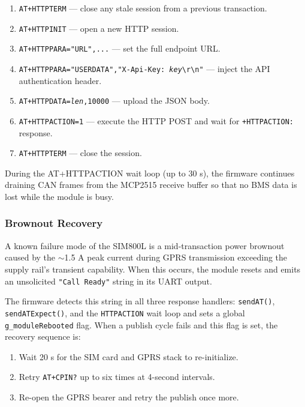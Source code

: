 \begin{enumerate}
    \item \texttt{AT+HTTPTERM} — close any stale session from a previous transaction.
    \item \texttt{AT+HTTPINIT} — open a new HTTP session.
    \item \texttt{AT+HTTPPARA="URL",...} — set the full endpoint URL.
    \item \texttt{AT+HTTPPARA="USERDATA","X-Api-Key: \textit{key}\textbackslash r\textbackslash n"} — inject the API authentication header.
    \item \texttt{AT+HTTPDATA=\textit{len},10000} — upload the JSON body.
    \item \texttt{AT+HTTPACTION=1} — execute the HTTP POST and wait for \texttt{+HTTPACTION:} response.
    \item \texttt{AT+HTTPTERM} — close the session.
\end{enumerate}

During the AT+HTTPACTION wait loop (up to 30 s), the firmware continues draining CAN frames from the MCP2515 receive buffer so that no BMS data is lost while the module is busy.

\subsubsection{Brownout Recovery}

A known failure mode of the SIM800L is a mid-transaction power brownout caused by the $\sim$1.5 A peak current during GPRS transmission exceeding the supply rail's transient capability. When this occurs, the module resets and emits an unsolicited \texttt{"Call Ready"} string in its UART output.

The firmware detects this string in all three response handlers: \texttt{sendAT()}, \texttt{sendATExpect()}, and the \texttt{HTTPACTION} wait loop and sets a global \texttt{g\_moduleRebooted} flag. When a publish cycle fails and this flag is set, the recovery sequence is:

\begin{enumerate}
    \item Wait 20 s for the SIM card and GPRS stack to re-initialize.
    \item Retry \texttt{AT+CPIN?} up to six times at 4-second intervals.
    \item Re-open the GPRS bearer and retry the publish once more.
\end{enumerate}

